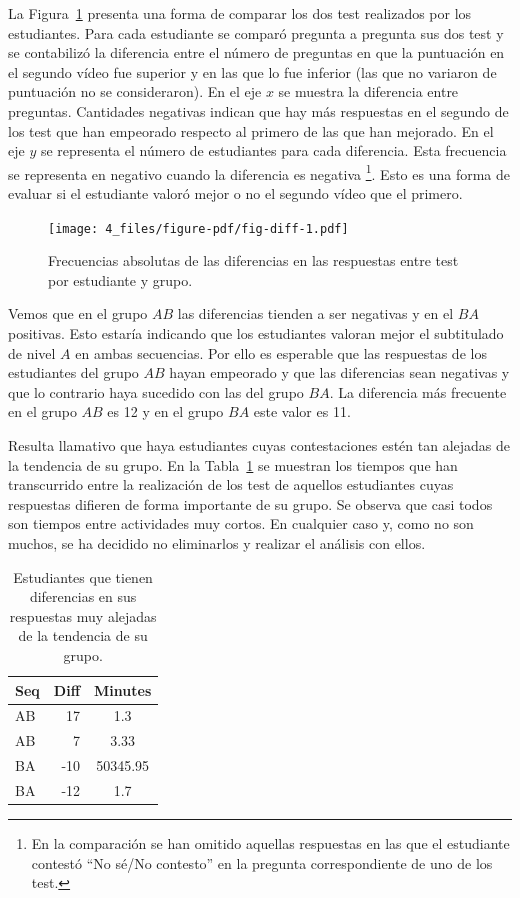 \documentclass[
  12pt,
  a4paper,
  extrafontsizes,
  onecolumn,
  openright]{memoir}
\begin{document}
La Figura~\ref{fig-diff} presenta una forma de comparar los dos test
realizados por los estudiantes. Para cada estudiante se comparó pregunta
a pregunta sus dos test y se contabilizó la diferencia entre el número
de preguntas en que la puntuación en el segundo vídeo fue superior y en
las que lo fue inferior (las que no variaron de puntuación no se
consideraron). En el eje \(x\) se muestra la diferencia entre preguntas.
Cantidades negativas indican que hay más respuestas en el segundo de los
test que han empeorado respecto al primero de las que han mejorado. En
el eje \(y\) se representa el número de estudiantes para cada
diferencia. Esta frecuencia se representa en negativo cuando la
diferencia es negativa \footnote{En la comparación se han omitido
  aquellas respuestas en las que el estudiante contestó \enquote{No
  sé/No contesto} en la pregunta correspondiente de uno de los test.}.
Esto es una forma de evaluar si el estudiante valoró mejor o no el
segundo vídeo que el primero.

\begin{figure}[h]

{\centering \texttt{[image: 4\_files/figure-pdf/fig-diff-1.pdf]}

}

\caption{\label{fig-diff}Frecuencias absolutas de las diferencias en las
respuestas entre test por estudiante y grupo.}

\end{figure}

Vemos que en el grupo \(AB\) las diferencias tienden a ser negativas y
en el \(BA\) positivas. Esto estaría indicando que los estudiantes
valoran mejor el subtitulado de nivel \(A\) en ambas secuencias. Por
ello es esperable que las respuestas de los estudiantes del grupo \(AB\)
hayan empeorado y que las diferencias sean negativas y que lo contrario
haya sucedido con las del grupo \(BA\). La diferencia más frecuente en
el grupo \(AB\) es 12 y en el grupo \(BA\) este valor es 11.

Resulta llamativo que haya estudiantes cuyas contestaciones estén tan
alejadas de la tendencia de su grupo. En la Tabla~\ref{tbl-diff} se
muestran los tiempos que han transcurrido entre la realización de los
test de aquellos estudiantes cuyas respuestas difieren de forma
importante de su grupo. Se observa que casi todos son tiempos entre
actividades muy cortos. En cualquier caso y, como no son muchos, se ha
decidido no eliminarlos y realizar el análisis con ellos.

\hypertarget{tbl-diff}{}
\begin{longtable}{lrc}
\caption{\label{tbl-diff}Estudiantes que tienen diferencias en sus respuestas muy alejadas de la
tendencia de su grupo. }\tabularnewline

\toprule
Seq & Diff & Minutes \\ 
\midrule
AB & 17 & 1.3 \\ 
AB & 7 & 3.33 \\ 
BA & -10 & 50345.95 \\ 
BA & -12 & 1.7 \\ 
\bottomrule
\end{longtable}
\end{document}
